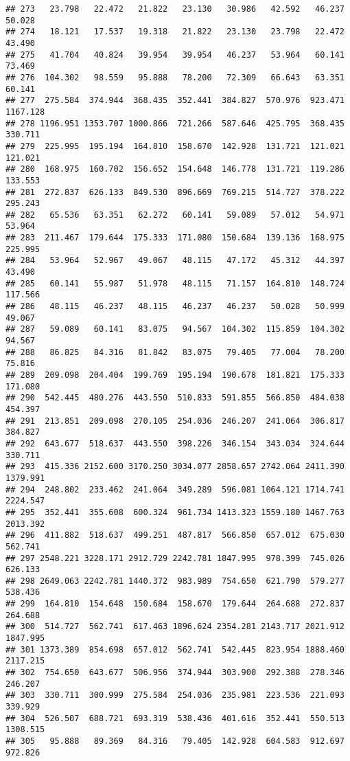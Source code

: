 \documentclass[
]{article}
\begin{document}
\begin{verbatim}
## 273   23.798   22.472   21.822   23.130   30.986   42.592   46.237   50.028
## 274   18.121   17.537   19.318   21.822   23.130   23.798   22.472   43.490
## 275   41.704   40.824   39.954   39.954   46.237   53.964   60.141   73.469
## 276  104.302   98.559   95.888   78.200   72.309   66.643   63.351   60.141
## 277  275.584  374.944  368.435  352.441  384.827  570.976  923.471 1167.128
## 278 1196.951 1353.707 1000.866  721.266  587.646  425.795  368.435  330.711
## 279  225.995  195.194  164.810  158.670  142.928  131.721  121.021  121.021
## 280  168.975  160.702  156.652  154.648  146.778  131.721  119.286  133.553
## 281  272.837  626.133  849.530  896.669  769.215  514.727  378.222  295.243
## 282   65.536   63.351   62.272   60.141   59.089   57.012   54.971   53.964
## 283  211.467  179.644  175.333  171.080  150.684  139.136  168.975  225.995
## 284   53.964   52.967   49.067   48.115   47.172   45.312   44.397   43.490
## 285   60.141   55.987   51.978   48.115   71.157  164.810  148.724  117.566
## 286   48.115   46.237   48.115   46.237   46.237   50.028   50.999   49.067
## 287   59.089   60.141   83.075   94.567  104.302  115.859  104.302   94.567
## 288   86.825   84.316   81.842   83.075   79.405   77.004   78.200   75.816
## 289  209.098  204.404  199.769  195.194  190.678  181.821  175.333  171.080
## 290  542.445  480.276  443.550  510.833  591.855  566.850  484.038  454.397
## 291  213.851  209.098  270.105  254.036  246.207  241.064  306.817  384.827
## 292  643.677  518.637  443.550  398.226  346.154  343.034  324.644  330.711
## 293  415.336 2152.600 3170.250 3034.077 2858.657 2742.064 2411.390 1379.991
## 294  248.802  233.462  241.064  349.289  596.081 1064.121 1714.741 2224.547
## 295  352.441  355.608  600.324  961.734 1413.323 1559.180 1467.763 2013.392
## 296  411.882  518.637  499.251  487.817  566.850  657.012  675.030  562.741
## 297 2548.221 3228.171 2912.729 2242.781 1847.995  978.399  745.026  626.133
## 298 2649.063 2242.781 1440.372  983.989  754.650  621.790  579.277  538.436
## 299  164.810  154.648  150.684  158.670  179.644  264.688  272.837  264.688
## 300  514.727  562.741  617.463 1896.624 2354.281 2143.717 2021.912 1847.995
## 301 1373.389  854.698  657.012  562.741  542.445  823.954 1888.460 2117.215
## 302  754.650  643.677  506.956  374.944  303.900  292.388  278.346  246.207
## 303  330.711  300.999  275.584  254.036  235.981  223.536  221.093  339.929
## 304  526.507  688.721  693.319  538.436  401.616  352.441  550.513 1308.515
## 305   95.888   89.369   84.316   79.405  142.928  604.583  912.697  972.826

\end{verbatim}
\end{document}
